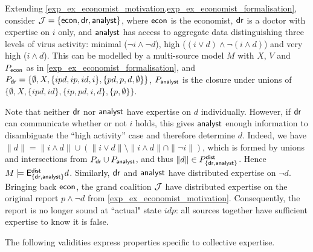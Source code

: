 \begin{example}
\label{exp_ex_mutlisource}

    Extending \cref{exp_ex_economist_motivation,exp_ex_economist_formalisation},
    consider $\mathcal{J} = \{\mathsf{econ}, \mathsf{dr}, \mathsf{analyst}\}$, where $\mathsf{econ}$ is the economist,
    $\mathsf{dr}$ is a doctor with expertise on $i$ only, and $\mathsf{analyst}$ has access to
    aggregate data distinguishing three levels of virus activity: minimal
    ($\neg i \land \neg d$), high ($(i \lor d) \land \neg(i \land d)$) and very
    high ($i \land d$). This can be modelled by a multi-source model $M$ with
    $X$, $V$ and $P_{\mathsf{econ}}$ as in \cref{exp_ex_economist_formalisation}, and $P_{\mathsf{dr}}
    = \{\emptyset, X, \{ipd, ip, id, i\}, \{pd, p, d, \emptyset\}\}$,
    $P_{\mathsf{analyst}}$ is the closure under unions of $\{\emptyset, X, \{ipd, id\},
    \{ip, pd, i, d\}, \{p, \emptyset\}\}$.

    Note that neither $\mathsf{dr}$ nor $\mathsf{analyst}$ have expertise on $d$ individually.
    However, if $\mathsf{dr}$ can communicate whether or not $i$ holds, this gives
    $\mathsf{analyst}$ enough information to disambiguate the ``high activity'' case
    and therefore determine $d$. Indeed, we have $\|d\| = \|i \land d\| \cup
    (\|i \lor d\| \setminus \|i \land d\| \cap \|\neg i\|)$, which is formed by
    unions and intersections from $P_{\mathsf{dr}} \cup P_{\mathsf{analyst}}$, and thus $\|d\| \in
    P^{\mathsf{dist}}_{\{\mathsf{dr}, \mathsf{analyst}\}}$. Hence $M \models \mathsf{E}_{\{\mathsf{dr}, \mathsf{analyst}\}}^{\mathsf{dist}}
    d$.
    Similarly, $\mathsf{dr}$ and $\mathsf{analyst}$ have distributed expertise on $\neg d$.
    Bringing back $\mathsf{econ}$, the grand coalition $\mathcal{J}$ have distributed expertise
    on the original report $p \land \neg d$ from
    \cref{exp_ex_economist_motivation}. Consequently, the report is no longer sound
    at ``actual" state $idp$: all sources together have sufficient expertise to
    know it is false.

\end{example}

The following validities express properties
specific to collective expertise.

